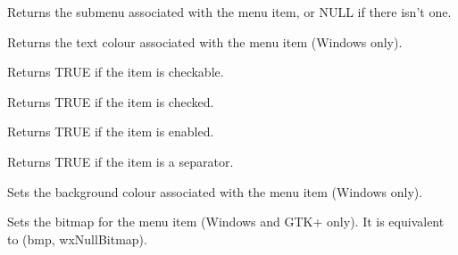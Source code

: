 \label{wxmenuitemgetsubmenu}


Returns the submenu associated with the menu item, or NULL if there isn't one.

\label{wxmenuitemgettextcolour}


Returns the text colour associated with the menu item (Windows only).

\label{wxmenuitemischeckable}


Returns TRUE if the item is checkable.

\label{wxmenuitemischecked}


Returns TRUE if the item is checked.

\label{wxmenuitemisenabled}


Returns TRUE if the item is enabled.

\label{wxmenuitemisseparator}


Returns TRUE if the item is a separator.

\label{wxmenuitemsetbackgroundcolour}


Sets the background colour associated with the menu item (Windows only).

\label{wxmenuitemsetbitmap}


Sets the bitmap for the menu item (Windows and GTK+ only). It is
equivalent to (bmp, wxNullBitmap).

\label{wxmenuitemsetbitmaps}


